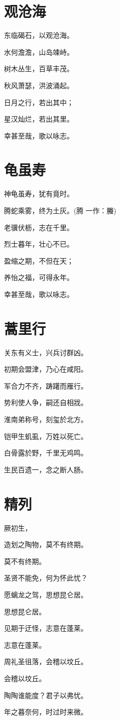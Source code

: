 \documentclass[12pt,a4paper]{ctexbook}
\begin{document}
\section{观沧海}
东临碣石，以观沧海。\par
水何澹澹，山岛竦峙。\par
树木丛生，百草丰茂。\par
秋风萧瑟，洪波涌起。\par
日月之行，若出其中；\par
星汉灿烂，若出其里。\par
幸甚至哉，歌以咏志。\par

\section{龟虽寿}
神龟虽寿，犹有竟时。\par
腾蛇乘雾，终为土灰。(腾 一作：螣)\par
老骥伏枥，志在千里。\par
烈士暮年，壮心不已。\par
盈缩之期，不但在天；\par
养怡之福，可得永年。\par
幸甚至哉，歌以咏志。\par

\section{蒿里行}
关东有义士，兴兵讨群凶。\par
初期会盟津，乃心在咸阳。\par
军合力不齐，踌躇而雁行。\par
势利使人争，嗣还自相戕。\par
淮南弟称号，刻玺於北方。\par
铠甲生虮虱，万姓以死亡。\par
白骨露於野，千里无鸡鸣。\par
生民百遗一，念之断人肠。\par

\section{精列}
厥初生，\par
造划之陶物，莫不有终期。\par
莫不有终期。\par
圣贤不能免，何为怀此忧？\par
愿螭龙之驾，思想昆仑居。\par
思想昆仑居。\par
见期于迂怪，志意在蓬莱。\par
志意在蓬莱。\par
周礼圣徂落，会稽以坟丘。\par
会稽以坟丘。\par
陶陶谁能度？君子以弗忧。\par
年之暮奈何，时过时来微。\par
\end{document}
